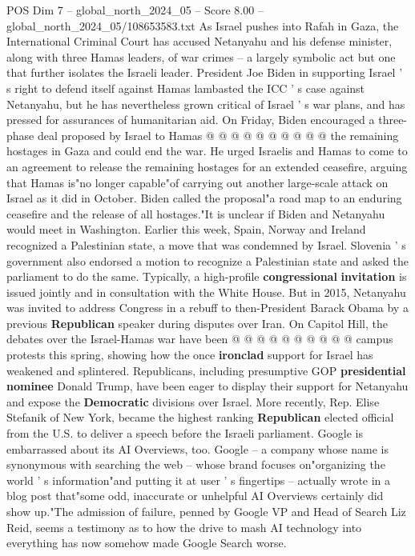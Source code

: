 \begin{textsample}{POS Dim 7 – global\_north\_2024\_05 – Score 8.00 – global\_north\_2024\_05/108653583.txt}
As Israel pushes into Rafah in Gaza, the International Criminal Court has accused Netanyahu and his defense minister, along with three Hamas leaders, of war crimes -- a largely symbolic act but one that further isolates the Israeli leader.
President Joe Biden in supporting Israel ' s right to defend itself against Hamas lambasted the ICC ' s case against Netanyahu, but he has nevertheless grown critical of Israel ' s war plans, and has pressed for assurances of humanitarian aid.
On Friday, Biden encouraged a three-phase deal proposed by Israel to Hamas @ @ @ @ @ @ @ @ @ @ the remaining hostages in Gaza and could end the war.
He urged Israelis and Hamas to come to an agreement to release the remaining hostages for an extended ceasefire, arguing that Hamas is"no longer capable"of carrying out another large-scale attack on Israel as it did in October.
Biden called the proposal"a road map to an enduring ceasefire and the release of all hostages."It is unclear if Biden and Netanyahu would meet in Washington.
Earlier this week, Spain, Norway and Ireland recognized a Palestinian state, a move that was condemned by Israel.
Slovenia ' s government also endorsed a motion to recognize a Palestinian state and asked the parliament to do the same.
Typically, a high-profile \textbf{congressional} \textbf{invitation} is issued jointly and in consultation with the White House.
But in 2015, Netanyahu was invited to address Congress in a rebuff to then-President Barack Obama by a previous \textbf{Republican} speaker during disputes over Iran.
On Capitol Hill, the debates over the Israel-Hamas war have been @ @ @ @ @ @ @ @ @ @ campus protests this spring, showing how the once \textbf{ironclad} support for Israel has weakened and splintered.
Republicans, including presumptive GOP \textbf{presidential} \textbf{nominee} Donald Trump, have been eager to display their support for Netanyahu and expose the \textbf{Democratic} divisions over Israel.
More recently, Rep.
Elise Stefanik of New York, became the highest ranking \textbf{Republican} elected official from the U.S. to deliver a speech before the Israeli parliament.
Google is embarrassed about its AI Overviews, too.
Google -- a company whose name is synonymous with searching the web -- whose brand focuses on"organizing the world ' s information"and putting it at user ' s fingertips -- actually wrote in a blog post that"some odd, inaccurate or unhelpful AI Overviews certainly did show up."The admission of failure, penned by Google VP and Head of Search Liz Reid, seems a testimony as to how the drive to mash AI technology into everything has now somehow made Google Search worse.

\end{textsample}
